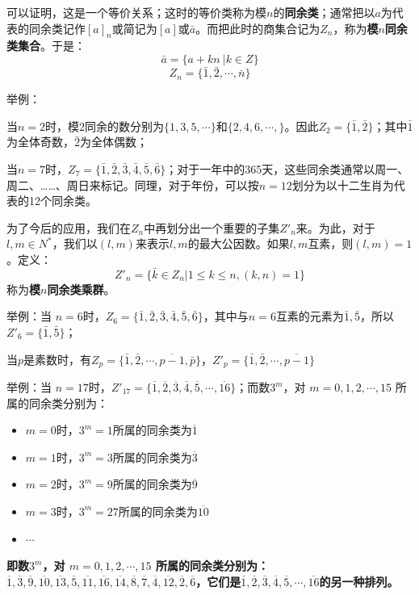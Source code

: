 \documentclass[12pt]{article}
\begin{document}
可以证明，这是一个等价关系；这时的等价类称为模$n$的\textbf{同余类}；通常把以$a$为代表的同余类记作$[a]_n$或简记为$[a]$或$\bar{a}$。而把此时的商集合记为$Z_n$，称为\textbf{模$n$同余类集合}。于是：
$$
\bar{a} = \{a + kn\ | k \in Z\}
$$
$$
Z_n = \{\bar{1}, \bar{2}, \cdots, \bar{n}\}
$$

\begin{framed}
\small {
举例：

当$n=2$时，模2同余的数分别为$\{1, 3, 5, \cdots\}$和$\{2, 4, 6, \cdots, \}$。因此$Z_2 = \{\bar{1}, \bar{2}\}$；其中$\bar{1}$为全体奇数，$\bar{2}$为全体偶数；

当$n=7$时，$Z_7 = \{\bar{1}, \bar{2}, \bar{3}, \bar{4}, \bar{5}, \bar{6} \}$；对于一年中的365天，这些同余类通常以周一、周二、……、周日来标记。同理，对于年份，可以按$n=12$划分为以十二生肖为代表的12个同余类。
}
\end{framed}

为了今后的应用，我们在$Z_n$中再划分出一个重要的子集$Z'_n$来。为此，对于$l, m \in N^*$，我们以$(l, m)$来表示$l, m$的最大公因数。如果$l, m$互素，则$(l,m)=1$。定义：
$$
Z'_n = \{\bar{k} \in Z_n | 1 \le k \le n, (k,n) = 1\}
$$
称为\textbf{模$n$同余类乘群}。

\begin{framed}
\small {
举例：当 $n=6$时，$Z_6 = \{\bar{1}, \bar{2}, \bar{3}, \bar{4}, \bar{5}, \bar{6}\}$，其中与$n=6$互素的元素为$\bar{1}, \bar{5}$，所以$Z'_6 = \{\bar{1}, \bar{5}\}$；
}
\end{framed}

当$p$是素数时，有$Z_p = \{\bar{1}, \bar{2}, \cdots, \overline{p-1}, \bar{p}\}$，$Z'_p = \{\bar{1}, \bar{2}, \cdots, \overline{p-1} \}$

\begin{framed}
\small {
举例：当 $n=17$时，$Z'_{17} = \{\overline{1}, \overline{2}, \overline{3}, \overline{4}, \overline{5},\cdots, \overline{16}\}$；而数$3^m$，对 $m = 0, 1, 2, \cdots, 15$ 所属的同余类分别为：
\begin{itemize}
\setlength{\itemsep}{0pt}
\setlength{\parsep}{0pt}
\setlength{\parskip}{0pt}
    \item $m=0$时，$3^m = 1$所属的同余类为$\overline{1}$
    \item $m=1$时，$3^m = 3$所属的同余类为$\overline{3}$
    \item $m=2$时，$3^m = 9$所属的同余类为$\overline{9}$
    \item $m=3$时，$3^m = 27$所属的同余类为$\overline{10}$
    \item $\cdots$
\end{itemize}

\textbf{即数$3^m$，对 $m = 0, 1, 2, \cdots, 15$ 所属的同余类分别为：$\overline{1}, \overline{3}, \overline{9}, \overline{10}, \overline{13}, \overline{5}, \overline{11}, \overline{16}, \overline{14}, \overline{8}, \overline{7}, \overline{4}, \overline{12}, \overline{2}, \overline{6}$，它们是$\bar{1}, \overline{2}, \overline{3}, \overline{4}, \overline{5},\cdots, \overline{16}$的另一种排列。}
}
\end{framed}
\end{document}
